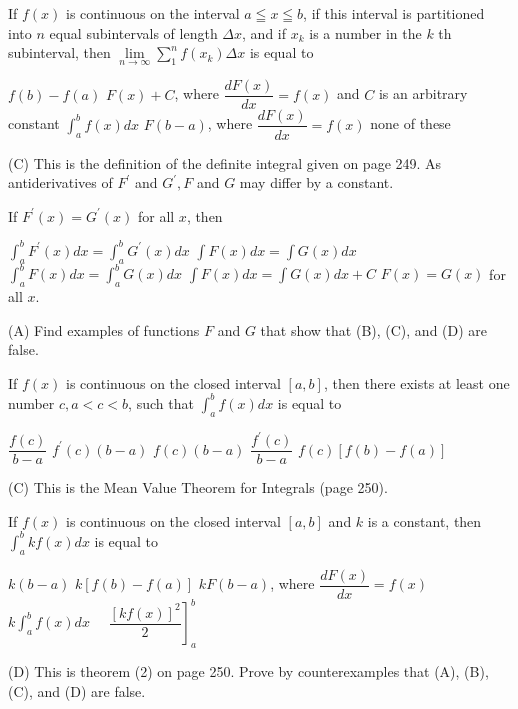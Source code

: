 \newpage




\question
If $f(x)$ is continuous on the interval $a \leqq x \leqq b$, if this interval is partitioned into $n$ equal subintervals of length $\Delta x$, and if $x_{k}$ is a number in the $k$ th subinterval, then $\lim\limits_{n \to \infty} \sum_{1}^{n} f\left(x_{k}\right) \Delta x$ is equal to
\begin{choices}
  \choice $f(b)-f(a)$
  \choice $F(x)+C$, where $\dfrac{d F(x)}{d x}=f(x)$ and $C$ is an arbitrary constant
  \CorrectChoice $\int_{a}^{b} f(x) d x$
  \choice $F(b-a)$, where $\dfrac{d F(x)}{d x}=f(x)$
  \choice none of these
\end{choices}
\begin{solution}
(C) This is the definition of the definite integral given on page 249. As antiderivatives of $F^{\prime}$ and $G^{\prime}, F$ and $G$ may differ by a constant.
\end{solution}

\question
If $F^{\prime}(x)=G^{\prime}(x)$ for all $x$, then
\begin{choices}
  \CorrectChoice $\int_{a}^{b} F^{\prime}(x) d x=\int_{a}^{b} G^{\prime}(x) d x$
  \choice $\int F(x) d x=\int G(x) d x$
  \choice $\int_{a}^{b} F(x) d x=\int_{a}^{b} G(x) d x$
  \choice $\int F(x) d x=\int G(x) d x+C$
  \choice $F(x)=G(x)$ for all $x$.
\end{choices}
\begin{solution}
(A) Find examples of functions $F$ and $G$ that show that (B), (C), and (D) are false.
\end{solution}

\question
If $f(x)$ is continuous on the closed interval $[a, b]$, then there exists at least one number $c, a<c<b$, such that $\int_{a}^{b} f(x) d x$ is equal to
\begin{choices}
  \choice $\dfrac{f(c)}{b-a}$
  \choice $f^{\prime}(c)(b-a)$
  \CorrectChoice $f(c)(b-a)$
  \choice $\dfrac{f^{\prime}(c)}{b-a}$
  \choice $f(c)[f(b)-f(a)]$
\end{choices}
\begin{solution}
(C) This is the Mean Value Theorem for Integrals (page 250).
\end{solution}




\newpage




\question
If $f(x)$ is continuous on the closed interval $[a, b]$ and $k$ is a constant, then $\int_{a}^{b} k f(x) d x$ is equal to
\begin{choices}
  \choice $k(b-a)$
  \choice $k[f(b)-f(a)]$
  \choice $k F(b-a)$, where $\dfrac{d F(x)}{d x}=f(x)$
  \CorrectChoice $k \int_{a}^{b} f(x) d x$
  \choice $\left.\quad \dfrac{[k f(x)]^{2}}{2}\right]_{a}^{b}$
\end{choices}
\begin{solution}
(D) This is theorem (2) on page 250. Prove by counterexamples that (A), (B), (C), and (D) are false.
\end{solution}

